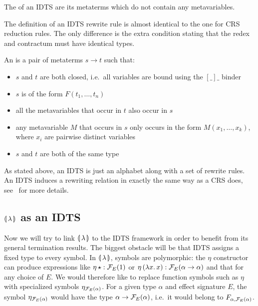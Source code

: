 \begin{definition}
  The  of an IDTS are its metaterms which do not contain any
  metavariables.
\end{definition}

The definition of an IDTS rewrite rule is almost identical to the one for
CRS reduction rules. The only difference is the extra condition stating
that the redex and contractum must have identical types.

\begin{definition}
  An  is a pair of metaterms $s \to t$ such that:
  \begin{itemize}
  \item $s$ and $t$ are both closed, i.e.\ all variables are bound using
    the $[\_]\_$ binder
  \item $s$ is of the form $F(t_1,\ldots,t_n)$
  \item all the metavariables that occur in $t$ also occur in $s$
  \item any metavariable $M$ that occurs in $s$ only occurs in the form
    $M(x_1,\ldots,x_k)$, where $x_i$ are pairwise distinct variables
  \item $s$ and $t$ are both of the same type
  \end{itemize}
\end{definition}

As stated above, an IDTS is just an alphabet along with a set of rewrite
rules. An IDTS induces a rewriting relation in exactly the same way as a
CRS does, see~\cite{blanqui2000termination} for more details.


\subsection{$\llparenthesis \, \lambda \, \rrparenthesis$ as an IDTS}
\label{ssec:banana-idts}

Now we will try to link $\llparenthesis \, \lambda \, \rrparenthesis$ to the IDTS framework in order
to benefit from its general termination results. The biggest obstacle will
be that IDTS assigns a fixed type to every symbol. In $\llparenthesis \, \lambda \, \rrparenthesis$,
symbols are polymorphic: the $\eta$ constructor can produce expressions
like $\eta\,\star : \mathcal{F}_E(1)$ or
$\eta\,(\lambda x.\, x) : \mathcal{F}_E(\alpha \to \alpha)$ and that for any choice of
$E$. We would therefore like to replace function symbols such as $\eta$
with specialized symbols $\eta_{\mathcal{F}_E(\alpha)}$. For a given type $\alpha$
and effect signature $E$, the symbol $\eta_{\mathcal{F}_E(\alpha)}$ would have the
type $\alpha \to \mathcal{F}_E(\alpha)$, i.e.\ it would belong to
$F_{\alpha,\mathcal{F}_E(\alpha)}$.

